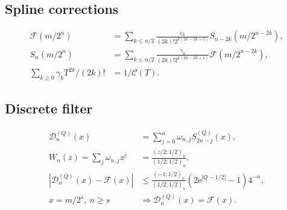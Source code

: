 \documentclass[11pt,oneside]{article}
\theoremstyle{definition}
\theoremstyle{remark}
\newcommand{\e}{\mathrm e}
\begin{document}
\subsection*{Spline corrections}
\begin{align*}
 \mathcal F(m/2^n)
 &=\sum_{k\le n/2}
 \frac{c_k}{(2k)!2^{k(2n-2k+1)}}
 S_{n-2k}(m/2^{n-2k}),\\
 S_n(m/2^n)
 &=\sum_{k\le n/2}
 \frac{\gamma_k}{(2k)!2^{k(2n-2k+1)}}
 \mathcal F(m/2^{n-2k}),\\
 \sum_{k\ge0}\gamma_kT^{2k}/(2k)!&=1/\mathscr C(T).
\end{align*}

\subsection*{Discrete filter}
\begin{align*}
 \mathcal D_n^{(Q)}(x)&=\sum_{j=0}^{n}\omega_{n,j}S_{2n-j}^{(Q)}(x),\\
 W_n(z)=\sum_j\omega_{n,j}z^j
 &=\frac{(z/2;1/2)_n}{(1/2;1/2)_n},\\
 |\mathcal D_n^{(Q)}(x)-\mathcal F(x)|
 &\le\frac{(-1;1/2)_n}{(1/2;1/2)_n}
 (2\e^{|Q-1/2|}-1)4^{-n},\\
 x=m/2^s,\ n\ge s&\Longrightarrow
 \mathcal D_n^{(Q)}(x)=\mathcal F(x).
\end{align*}
\end{document}
